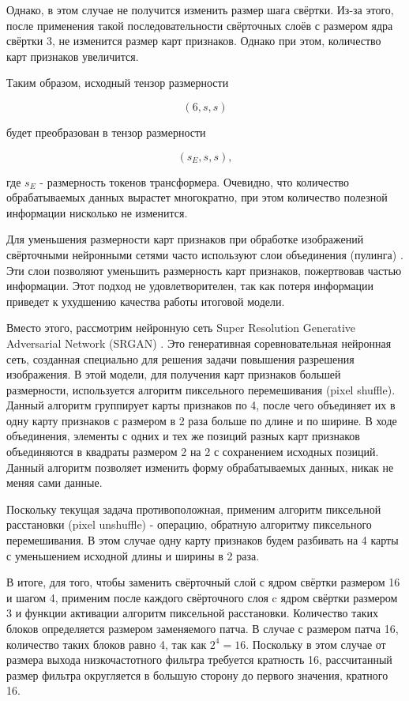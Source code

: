 \documentclass[times,specification,annotation]{itmo-student-thesis}
\begin{document}
Однако, в этом случае не получится изменить размер шага свёртки. Из-за этого, после применения такой последовательности свёрточных слоёв с размером ядра свёртки 3, не изменится размер карт признаков. Однако при этом, количество карт признаков увеличится.

Таким образом, исходный тензор размерности

$$(6, s, s)$$

будет преобразован в тензор размерности 

$$
(s_E, s, s),
$$

где $s_E$ - размерность токенов трансформера. Очевидно, что количество обрабатываемых данных вырастет многократно, при этом количество полезной информации нисколько не изменится. 

Для уменьшения размерности карт признаков при обработке изображений свёрточными нейронными сетями часто используют слои объединения (пулинга) \cite{goodfellow_dl}. Эти слои позволяют уменьшить размерность карт признаков, пожертвовав частью информации. Этот подход не удовлетворителен, так как потеря информации приведет к ухудшению качества работы итоговой модели. 

Вместо этого, рассмотрим нейронную сеть Super Resolution Generative Adversarial Network (SRGAN) \cite{srgan}. Это генеративная соревновательная нейронная сеть, созданная специально для решения задачи повышения разрешения изображения. В этой модели, для получения карт признаков большей размерности, используется алгоритм пиксельного перемешивания (pixel shuffle). Данный алгоритм группирует карты признаков по 4, после чего объединяет их в одну карту признаков с размером в 2 раза больше по длине и по ширине. В ходе объединения, элементы с одних и тех же позиций разных карт признаков объединяются в квадраты размером 2 на 2 с сохранением исходных позиций. Данный алгоритм позволяет изменить форму обрабатываемых данных, никак не меняя сами данные.

Поскольку текущая задача противоположная, применим алгоритм пиксельной расстановки (pixel unshuffle) - операцию, обратную алгоритму пиксельного перемешивания. В этом случае одну карту признаков будем разбивать на 4 карты с уменьшением исходной длины и ширины в 2 раза. 

В итоге, для того, чтобы заменить свёрточный слой с ядром свёртки размером 16 и шагом 4, применим после каждого свёрточного слоя c ядром свёртки размером 3 и функции активации алгоритм пиксельной расстановки. Количество таких блоков определяется размером заменяемого патча. В случае с размером патча 16, количество таких блоков равно 4, так как $2^4 = 16$. Поскольку в этом случае от размера выхода низкочастотного фильтра требуется кратность 16, рассчитанный размер фильтра округляется в большую сторону до первого значения, кратного 16.
\end{document}
